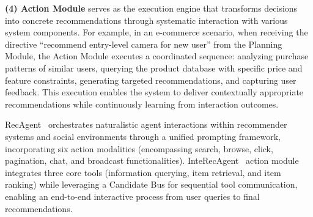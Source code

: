 \textbf{(4) Action Module} serves as the execution engine that transforms decisions into concrete recommendations through systematic interaction with various system components.  
For example, in an e-commerce scenario, when receiving the directive ``recommend entry-level camera for new user'' from the Planning Module, the Action Module executes a coordinated sequence: analyzing purchase patterns of similar users, querying the product database with specific price and feature constraints, generating targeted recommendations, and capturing user feedback. 
This execution enables the system to deliver contextually appropriate recommendations while continuously learning from interaction outcomes.

RecAgent~\cite{wang2023user} orchestrates naturalistic agent interactions within recommender systems and social environments through a unified prompting framework, incorporating six action modalities (encompassing search, browse, click, pagination, chat, and broadcast functionalities).
InteRecAgent~\cite{huang2023recommender} action module integrates three core tools (information querying, item retrieval, and item ranking) while leveraging a Candidate Bus for sequential tool communication, enabling an end-to-end interactive process from user queries to final recommendations.


